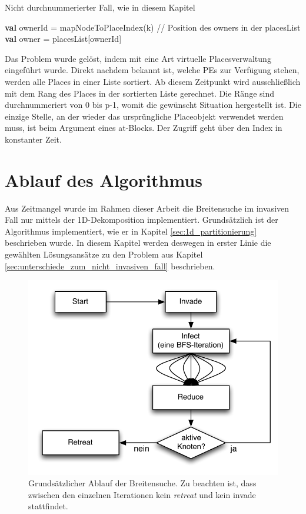 \begin{algorithm}
	\caption{Nicht durchnummerierter Fall, wie in diesem Kapitel}
	\label{alg:owner_random}
	\begin{algorithmic}[1]
		\State \textbf{val} ownerId = mapNodeToPlaceIndex(k) // Position des owners in der placesList
		\State \textbf{val} owner   = placesList[ownerId]
	\end{algorithmic}
\end{algorithm}

Das Problem wurde gelöst, indem mit eine Art virtuelle Placesverwaltung eingeführt wurde. Direkt nachdem bekannt ist, welche PEs zur Verfügung stehen, werden alle Places in einer Liste sortiert. Ab diesem Zeitpunkt wird ausschließlich mit dem Rang des Places in der sortierten Liste gerechnet. Die Ränge sind durchnummeriert von 0 bis p-1, womit die gewünscht Situation hergestellt ist. Die einzige Stelle, an der wieder das ursprüngliche Placeobjekt verwendet werden muss, ist beim Argument eines at{}-Blocks. Der Zugriff geht  über den Index in konstanter Zeit.

\section{Ablauf des Algorithmus} %
\label{sec:ablauf_des_algorithmus}
Aus Zeitmangel wurde im Rahmen dieser Arbeit die Breitensuche im invasiven Fall nur mittels der 1D-Dekomposition implementiert. Grundsätzlich ist der Algorithmus implementiert, wie er in Kapitel \ref{sec:1d_partitionierung} beschrieben wurde. In diesem Kapitel werden deswegen in erster Linie die gewählten Lösungsansätze zu den Problem aus Kapitel \ref{sec:unterschiede_zum_nicht_invasiven_fall} beschrieben.
\begin{figure}[ht]
	\centering
	\label{img:invasive-flow}
	\includegraphics{pics/invasive-flow.pdf}
	\caption{Grundsätzlicher Ablauf der Breitensuche. Zu beachten ist, dass zwischen den einzelnen Iterationen kein \textit{retreat} und kein invade stattfindet.}
\end{figure}

